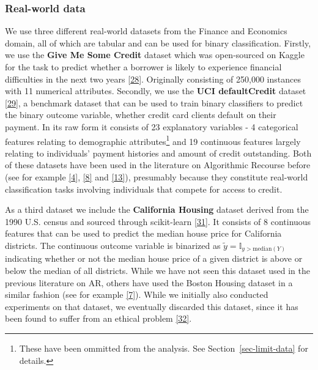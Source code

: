 \documentclass[
  conference]{IEEEtran}
\begin{document}
\hypertarget{real-world-data}{%
\subsubsection{Real-world data}\label{real-world-data}}

We use three different real-world datasets from the Finance and
Economics domain, all of which are tabular and can be used for binary
classification. Firstly, we use the \textbf{Give Me Some Credit} dataset
which was open-sourced on Kaggle for the task to predict whether a
borrower is likely to experience financial difficulties in the next two
years \protect\hyperlink{ref-gmsc_data}{{[}28{]}}. Originally consisting
of 250,000 instances with 11 numerical attributes. Secondly, we use the
\textbf{UCI defaultCredit} dataset
\protect\hyperlink{ref-yeh2009comparisons}{{[}29{]}}, a benchmark
dataset that can be used to train binary classifiers to predict the
binary outcome variable, whether credit card clients default on their
payment. In its raw form it consists of 23 explanatory variables - 4
categorical features relating to demographic attributes\footnote{These
  have been ommitted from the analysis. See Section~\ref{sec-limit-data}
  for details.} and 19 continuous features largely relating to
individuals' payment histories and amount of credit outstanding. Both of
these datasets have been used in the literature on Algorithmic Recourse
before (see for example
\protect\hyperlink{ref-pawelczyk2021carla}{{[}4{]}},
\protect\hyperlink{ref-joshi2019towards}{{[}8{]}} and
\protect\hyperlink{ref-ustun2019actionable}{{[}13{]}}), presumably
because they constitute real-world classification tasks involving
individuals that compete for access to credit.

As a third dataset we include the \textbf{California Housing} dataset
derived from the 1990 U.S. census and sourced through scikit-learn
\protect\hyperlink{ref-pace1997sparse}{{[}31{]}}. It consists of 8
continuous features that can be used to predict the median house price
for California districts. The continuous outcome variable is binarized
as \(\tilde{y}=\mathbb{I}_{y>\text{median}(Y)}\) indicating whether or
not the median house price of a given district is above or below the
median of all districts. While we have not seen this dataset used in the
previous literature on AR, others have used the Boston Housing dataset
in a similar fashion (see for example
\protect\hyperlink{ref-schut2021generating}{{[}7{]}}). While we
initially also conducted experiments on that dataset, we eventually
discarded this dataset, since it has been found to suffer from an
ethical problem \protect\hyperlink{ref-carlisle2019racist}{{[}32{]}}.
\end{document}
